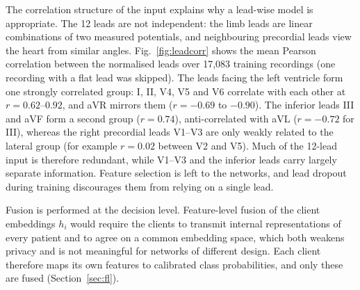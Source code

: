 The correlation structure of the input explains why a lead-wise model is appropriate. The 12 leads
are not independent: the limb leads are linear combinations of two measured potentials, and
neighbouring precordial leads view the heart from similar angles. Fig.~\ref{fig:leadcorr} shows the
mean Pearson correlation between the normalised leads over 17,083 training recordings (one recording
with a flat lead was skipped). The leads facing the left ventricle form one strongly correlated group:
I, II, V4, V5 and V6 correlate with each other at $r=0.62$--$0.92$, and aVR mirrors them
($r=-0.69$ to $-0.90$). The inferior leads III and aVF form a second group ($r=0.74$), anti-correlated
with aVL ($r=-0.72$ for III), whereas the right precordial leads V1--V3 are only weakly related to the
lateral group (for example $r=0.02$ between V2 and V5). Much of the 12-lead input is therefore
redundant, while V1--V3 and the inferior leads carry largely separate information. Feature selection
is left to the networks, and lead dropout during training discourages them from relying on a single
lead.

Fusion is performed at the decision level. Feature-level fusion of the client embeddings
$h_i$ would require the clients to transmit internal representations of every patient and to agree
on a common embedding space, which both weakens privacy and is not meaningful for networks of
different design. Each client therefore maps its own features to calibrated class probabilities, and
only these are fused (Section~\ref{sec:fl}).

\begin{table}[!t]
\centering
\caption{Learned features per client}
\label{tab:features}
\footnotesize
\setlength{\tabcolsep}{3pt}
\end{table}

